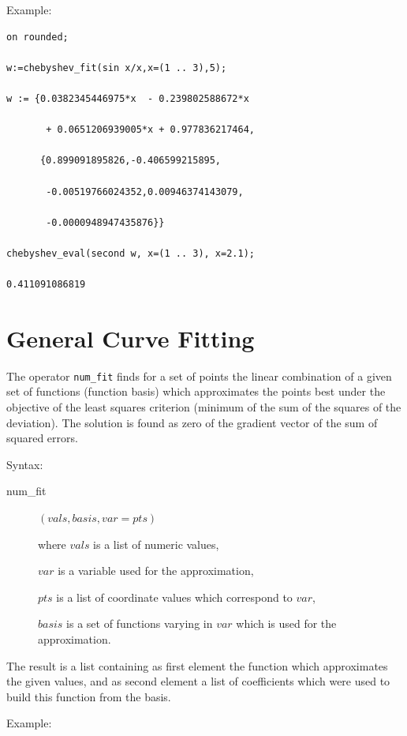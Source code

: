Example:

\begin{verbatim}
on rounded;

w:=chebyshev_fit(sin x/x,x=(1 .. 3),5);

w := {0.0382345446975*x  - 0.239802588672*x

       + 0.0651206939005*x + 0.977836217464,

      {0.899091895826,-0.406599215895,

       -0.00519766024352,0.00946374143079,

       -0.0000948947435876}}

chebyshev_eval(second w, x=(1 .. 3), x=2.1);

0.411091086819
\end{verbatim}

\section{General Curve Fitting}
\hypertarget{operator:NUM_FIT}{}

The operator \texttt{num\_fit} finds for a set of
points the linear combination of a given set of
functions (function basis) which approximates the
points best under the objective of the least squares
criterion (minimum of the sum of the squares of the deviation).
The solution is found as zero of the
gradient vector of the sum of squared errors.

Syntax:

\begin{description}
\item[num\_fit] $(vals,basis,var=pts)$

where $vals$ is a list of numeric values,

$var$ is a variable used for the approximation,

$pts$ is a list of coordinate values which correspond to $var$,

$basis$ is a set of functions varying in $var$ which is used
  for the approximation.

\end{description}

The result is a list containing as first element the
function which approximates the given values, and as
second element a list of coefficients which were used
to build this function from the basis.

Example:

